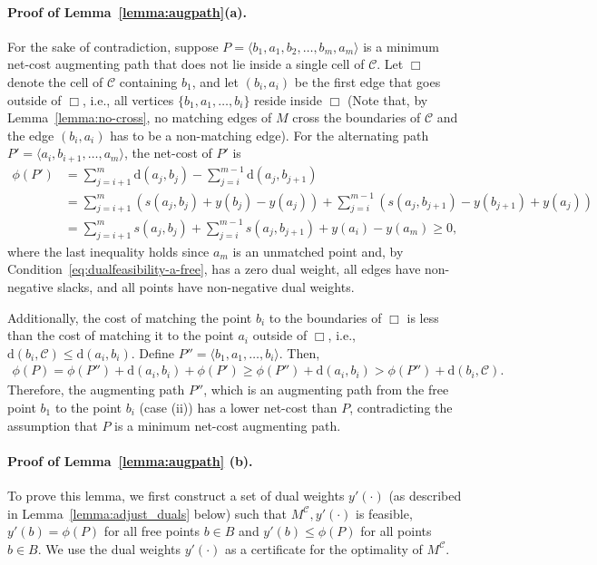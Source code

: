 \documentclass[11pt,onecolumn]{article}
\def\mcC{{\mathcal{C}}}
\newcommand{\cell}{\Box}
\newcommand{\distance}[2]{\mathrm{d}(#1, #2)}
\newcommand\myparagraph[1]{\paragraph{#1}}
\begin{document}
\myparagraph{Proof of Lemma~\ref{lemma:augpath}(a).} For the sake of contradiction, suppose $P = \langle b_1, a_1, b_2, \ldots, b_m, a_m\rangle$ is a minimum net-cost augmenting path that does not lie inside a single cell of $\mcC$. Let $\cell$ denote the cell of $\mcC$ containing $b_1$, and let $(b_i, a_i)$ be the first edge that goes outside of $\cell$, i.e., all vertices $\{b_1, a_1,\ldots, b_i\}$ reside inside $\cell$ (Note that, by Lemma~\ref{lemma:no-cross}, no matching edges of $M$ cross the boundaries of $\mcC$ and the edge $(b_i, a_i)$ has to be a non-matching edge). For the alternating path $P'=\langle a_i, b_{i+1}, \ldots, a_{m}\rangle$, the net-cost of $P'$ is 
\begin{align*}
    \phi(P')&=\sum_{j=i+1}^m \distance{a_{j}}{b_{j}} - \sum_{j=i}^{m-1} \distance{a_{j}}{b_{j+1}}\\&= \sum_{j=i+1}^m (s(a_j,b_j) + y(b_j)-y(a_j)) + \sum_{j=i}^{m-1} (s(a_j,b_{j+1}) - y(b_{j+1})+y(a_j))\\ &= \sum_{j=i+1}^m s(a_j,b_j) + \sum_{j=i}^{m-1} s(a_j,b_{j+1}) + y(a_i) - y(a_m) \ge 0,
\end{align*}
where the last inequality holds since $a_m$ is an unmatched point and, by Condition~\eqref{eq:dualfeasibility-a-free}, has a zero dual weight, all edges have non-negative slacks, and all points have non-negative dual weights. 

Additionally, the cost of matching the point $b_i$ to the boundaries of $\cell$ is less than the cost of matching it to the point $a_i$ outside of $\cell$, i.e., $\distance{b_i}{\mcC}\le \distance{a_i}{b_i}$. Define $P''=\langle b_1, a_1, \ldots, b_i\rangle$. Then, 
\begin{align*}
    \phi(P) = \phi(P'')+\distance{a_i}{b_i} + \phi(P') \ge \phi(P'')+\distance{a_i}{b_i} > \phi(P'')+\distance{b_i}{\mcC}.
\end{align*}
Therefore, the augmenting path $P''$, which is an augmenting path from the free point $b_1$ to the point $b_i$ (case (ii)) has a lower net-cost than $P$, contradicting the assumption that $P$ is a minimum net-cost augmenting path. 


\myparagraph{Proof of Lemma~\ref{lemma:augpath} (b).} To prove this lemma, we first construct a set of dual weights $y'(\cdot)$ (as described in Lemma~\ref{lemma:adjust_duals} below) such that $M^\mcC, y'(\cdot)$ is feasible, $y'(b)=\phi(P)$ for all free points $b\in B$ and $y'(b)\le \phi(P)$ for all points $b\in B$. We use the dual weights $y'(\cdot)$ as a certificate for the optimality of $M^\mcC$. 
\end{document}
